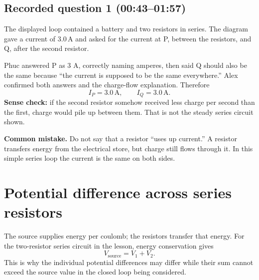 \documentclass[11pt,a4paper]{article}
\newcommand{\trap}[1]{\colorbox{warn}{\parbox{0.96\linewidth}{#1}}}
\begin{document}
\begin{center}
\end{center}

\subsection{Recorded question 1 (00:43--01:57)}
The displayed loop contained a battery and two resistors in series. The diagram gave a current of $3.0\,\mathrm{A}$ and asked for the current at P, between the resistors, and Q, after the second resistor.

Phuc answered P as 3 A, correctly naming amperes, then said Q should also be the same because ``the current is supposed to be the same everywhere.'' Alex confirmed both answers and the charge-flow explanation. Therefore
\[
\boxed{I_P=3.0\,\mathrm{A}},\qquad \boxed{I_Q=3.0\,\mathrm{A}}.
\]
\textbf{Sense check:} if the second resistor somehow received less charge per second than the first, charge would pile up between them. That is not the steady series circuit shown.

\trap{\textbf{Common mistake.} Do not say that a resistor ``uses up current.'' A resistor transfers energy from the electrical store, but charge still flows through it. In this simple series loop the current is the same on both sides.}

\section{Potential difference across series resistors}
The source supplies energy per coulomb; the resistors transfer that energy. For the two-resistor series circuit in the lesson, energy conservation gives
\[
\boxed{V_{\text{source}}=V_1+V_2}.
\]
This is why the individual potential differences may differ while their sum cannot exceed the source value in the closed loop being considered.
\end{document}
